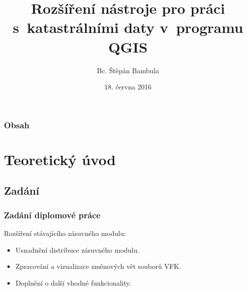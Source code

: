 \documentclass{beamer}
\title[QGIS VFK Plugin Improvements]{Rozšíření nástroje pro práci s~katastrálními daty v~programu QGIS} %
\author{Bc. Štěpán Bambula} %
\institute[ČVUT] %
{
České vysoké učení technické v Praze \\ %
Fakulta stavební \\
Obor Geomatika
}
\date{18. června 2016} %
\begin{document}
\begin{frame}
\titlepage %
\end{frame}

\begin{frame}
\frametitle{Obsah} %
\tableofcontents %
\end{frame}


\section{Teoretický úvod} %
\subsection{Zadání} %

\begin{frame}
\frametitle{Zadání diplomové práce}

\begin{block}{Rozšíření stávajícího zásuvného modulu:}
  \begin{itemize}
    \item Usnadnění distribuce zásuvného modulu.
    \item Zpracování a vizualizace změnových vět souborů VFK.
    \item Doplnění o další vhodné funkcionality.
  \end{itemize}
\end{block}

\end{frame}
\end{document}
